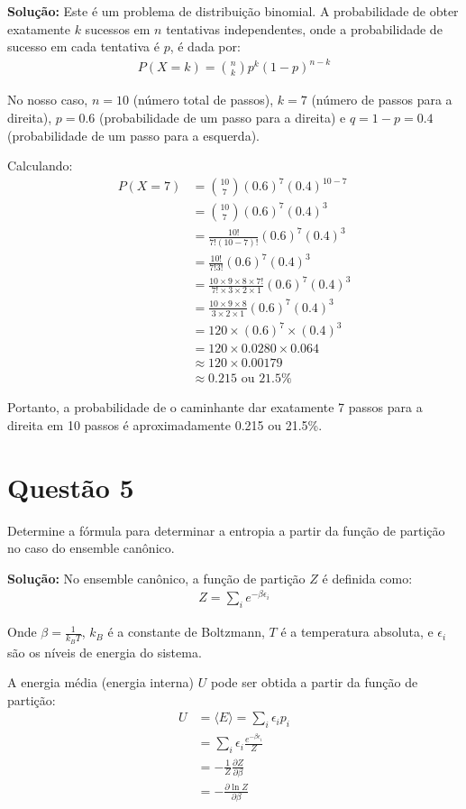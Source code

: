 \documentclass[fleqn,a4paper]{article}
\begin{document}
\textbf{Solução:}
Este é um problema de distribuição binomial. A probabilidade de obter exatamente $k$ sucessos em $n$ tentativas independentes, onde a probabilidade de sucesso em cada tentativa é $p$, é dada por:
\begin{align}
P(X = k) = \binom{n}{k} p^k (1-p)^{n-k}
\end{align}

No nosso caso, $n = 10$ (número total de passos), $k = 7$ (número de passos para a direita), $p = 0.6$ (probabilidade de um passo para a direita) e $q = 1 - p = 0.4$ (probabilidade de um passo para a esquerda).

Calculando:
\begin{align}
P(X = 7) &= \binom{10}{7} (0.6)^7 (0.4)^{10-7} \\
&= \binom{10}{7} (0.6)^7 (0.4)^3 \\
&= \frac{10!}{7!(10-7)!} (0.6)^7 (0.4)^3 \\
&= \frac{10!}{7!3!} (0.6)^7 (0.4)^3 \\
&= \frac{10 \times 9 \times 8 \times 7!}{7! \times 3 \times 2 \times 1} (0.6)^7 (0.4)^3 \\
&= \frac{10 \times 9 \times 8}{3 \times 2 \times 1} (0.6)^7 (0.4)^3 \\
&= 120 \times (0.6)^7 \times (0.4)^3 \\
&= 120 \times 0.0280 \times 0.064 \\
&\approx 120 \times 0.00179 \\
&\approx 0.215 \text{ ou } 21.5\%
\end{align}

Portanto, a probabilidade de o caminhante dar exatamente 7 passos para a direita em 10 passos é aproximadamente 0.215 ou 21.5\%.

\section*{Questão 5}
Determine a fórmula para determinar a entropia a partir da função de partição no caso do ensemble canônico.

\textbf{Solução:}
No ensemble canônico, a função de partição $Z$ é definida como:
\begin{align}
Z = \sum_i e^{-\beta \epsilon_i}
\end{align}

Onde $\beta = \frac{1}{k_B T}$, $k_B$ é a constante de Boltzmann, $T$ é a temperatura absoluta, e $\epsilon_i$ são os níveis de energia do sistema.

A energia média (energia interna) $U$ pode ser obtida a partir da função de partição:
\begin{align}
U &= \langle E \rangle = \sum_i \epsilon_i p_i \\
&= \sum_i \epsilon_i \frac{e^{-\beta \epsilon_i}}{Z} \\
&= -\frac{1}{Z} \frac{\partial Z}{\partial \beta} \\
&= -\frac{\partial \ln Z}{\partial \beta}
\end{align}
\end{document}
